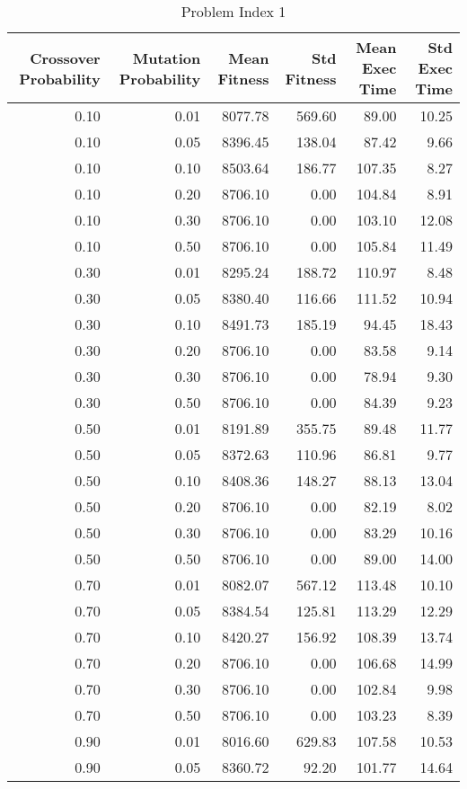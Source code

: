 \begin{table}
\caption{Problem Index 1}
\label{tab:problem_1}
\begin{tabular}{rrrrrr}
\toprule
Crossover Probability & Mutation Probability & Mean Fitness & Std Fitness & Mean Exec Time & Std Exec Time \\
\midrule
0.10 & 0.01 & 8077.78 & 569.60 & 89.00 & 10.25 \\
0.10 & 0.05 & 8396.45 & 138.04 & 87.42 & 9.66 \\
0.10 & 0.10 & 8503.64 & 186.77 & 107.35 & 8.27 \\
0.10 & 0.20 & 8706.10 & 0.00 & 104.84 & 8.91 \\
0.10 & 0.30 & 8706.10 & 0.00 & 103.10 & 12.08 \\
0.10 & 0.50 & 8706.10 & 0.00 & 105.84 & 11.49 \\
0.30 & 0.01 & 8295.24 & 188.72 & 110.97 & 8.48 \\
0.30 & 0.05 & 8380.40 & 116.66 & 111.52 & 10.94 \\
0.30 & 0.10 & 8491.73 & 185.19 & 94.45 & 18.43 \\
0.30 & 0.20 & 8706.10 & 0.00 & 83.58 & 9.14 \\
0.30 & 0.30 & 8706.10 & 0.00 & 78.94 & 9.30 \\
0.30 & 0.50 & 8706.10 & 0.00 & 84.39 & 9.23 \\
0.50 & 0.01 & 8191.89 & 355.75 & 89.48 & 11.77 \\
0.50 & 0.05 & 8372.63 & 110.96 & 86.81 & 9.77 \\
0.50 & 0.10 & 8408.36 & 148.27 & 88.13 & 13.04 \\
0.50 & 0.20 & 8706.10 & 0.00 & 82.19 & 8.02 \\
0.50 & 0.30 & 8706.10 & 0.00 & 83.29 & 10.16 \\
0.50 & 0.50 & 8706.10 & 0.00 & 89.00 & 14.00 \\
0.70 & 0.01 & 8082.07 & 567.12 & 113.48 & 10.10 \\
0.70 & 0.05 & 8384.54 & 125.81 & 113.29 & 12.29 \\
0.70 & 0.10 & 8420.27 & 156.92 & 108.39 & 13.74 \\
0.70 & 0.20 & 8706.10 & 0.00 & 106.68 & 14.99 \\
0.70 & 0.30 & 8706.10 & 0.00 & 102.84 & 9.98 \\
0.70 & 0.50 & 8706.10 & 0.00 & 103.23 & 8.39 \\
0.90 & 0.01 & 8016.60 & 629.83 & 107.58 & 10.53 \\
0.90 & 0.05 & 8360.72 & 92.20 & 101.77 & 14.64 \\

\end{tabular}
\end{table}
